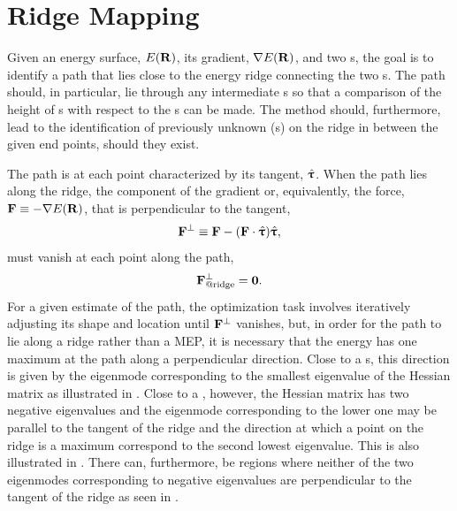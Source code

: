 \section{Ridge Mapping}
\label{sec:ridge-mapping}
Given an energy surface, $E({\mathrm{\mathbf{\bm{R}}}})$, its gradient, $\nabla E({\mathrm{\mathbf{\bm{R}}}})$, and two s, the goal is to identify a path that lies close to the energy ridge connecting the two s.
The path should, in particular, lie through any intermediate s so that a comparison of the height of s with respect to the s can be made.
The method should, furthermore, lead to the identification of previously unknown (s) on the ridge in between the given end points, should they exist.

The path is at each point characterized by its tangent, $\hat{{\mathrm{\mathbf{\bm{\uptau}}}}}$.
When the path lies along the ridge, the component of the gradient or, equivalently, the force, ${\mathrm{\mathbf{\bm{F}}}} \equiv -\nabla E({\mathrm{\mathbf{\bm{R}}}})$, that is perpendicular to the tangent,
\begin{equation}
   {\ensuremath{\mathrm{\mathbf{\bm{F}}}}}^\perp \equiv {\ensuremath{\mathrm{\mathbf{\bm{F}}}}} - ({\mathrm{\mathbf{\bm{F}}}} \cdot \hat{{\mathrm{\mathbf{\bm{\uptau}}}}})\hat{{\mathrm{\mathbf{\bm{\uptau}}}}},
\label{eq:perpendicular-force}
\end{equation}
must vanish at each point along the path,
\begin{equation}
   {\ensuremath{\mathrm{\mathbf{\bm{F}}}}}^\perp_\text{@ridge} = \textbf{0}.
\label{eq:ridge-force-criterion}
\end{equation}
For a given estimate of the path, the optimization task involves iteratively adjusting its shape and location until ${\mathrm{\mathbf{\bm{F}}}}^\perp$ vanishes,
but, in order for the path to lie along a ridge rather than a MEP, it is necessary that the energy has one maximum at the path along a perpendicular direction.
Close to a s, this direction is given by the eigenmode corresponding to the smallest eigenvalue of the Hessian matrix as illustrated in .
Close to a , however, the Hessian matrix has two negative eigenvalues and the eigenmode corresponding to the lower one may be parallel to the tangent of the ridge and the direction at which a point on the ridge is a maximum correspond to the second lowest eigenvalue.
This is also illustrated in .
There can, furthermore, be regions where neither of the two eigenmodes corresponding to negative eigenvalues are perpendicular to the tangent of the ridge as seen in .

